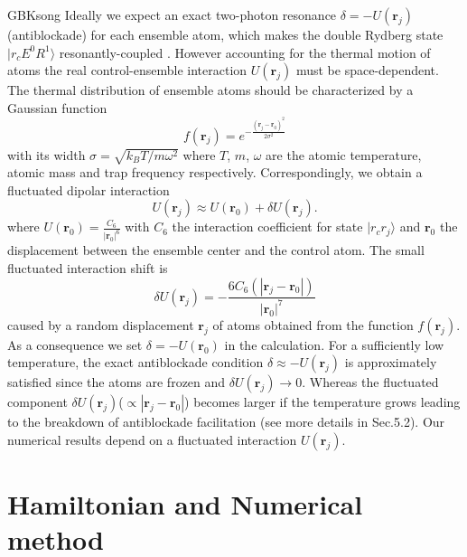 \documentclass{cpbtex}
\begin{document}
\begin{CJK*}{GBK}{song}
Ideally we expect an exact two-photon resonance $\delta=-U(\bm{r}_j)$(antiblockade) for each ensemble atom, which makes the double Rydberg state $|r_cE^0R^1\rangle$ resonantly-coupled \cite{Ding_2019,PhysRevA.82.062328,PhysRevA.101.042328}.
However accounting for the thermal motion of atoms the real control-ensemble interaction $U(\bm{r}_j)$ must be space-dependent. The thermal distribution of ensemble atoms should be characterized by a Gaussian function \cite{PhysRevLett.118.063606}
\begin{equation}
    f(\bm{r}_j) = e^{-\frac{(\bm{r}_j-\bm{r}_0)^2}{2\sigma^2}}
    \label{Gau1}
\end{equation}
with its width $\sigma=\sqrt{k_BT/m\omega^2}$ where $T$, $m$, $\omega$ are the atomic temperature, atomic mass and trap frequency respectively. Correspondingly, we obtain a fluctuated dipolar interaction \cite{PhysRevLett.128.013603}
\begin{equation}
    U(\bm{r}_j) \approx U(\bm{r}_0)+\delta U(\bm{r}_j).
    \label{perU}
\end{equation}
where $U(\bm{r}_0)=\frac{C_6}{|\bm{r}_0|^6}$ with $C_6$ the interaction coefficient for state $|r_cr_j\rangle$ and $\bm{r}_0$ the displacement between the ensemble center and the control atom. 
The small fluctuated interaction shift is
\begin{equation}
    \delta U(\bm{r}_j)=-\frac{6 C_6(|\bm{r}_j-\bm{r}_0|)}{|\bm{r}_0|^7}
    \label{devr}
\end{equation}
caused by a random displacement $\bm{r}_j$ of atoms obtained from the function $f(\bm{r}_j)$. As a consequence we set $\delta=-U(\mathbf{r}_0)$ in the calculation. For a sufficiently low temperature, the exact antiblockade condition $\delta\approx-U(\bm{r}_j)$ is approximately satisfied since the atoms are frozen and $\delta U(\bm{r}_j)\to 0$. Whereas
the fluctuated component $\delta U(\bm{r}_j)$($\propto  |\bm{r}_j-\bm{r}_0|$) becomes larger if the temperature grows leading to the breakdown of antiblockade facilitation (see more details in Sec.5.2).
Our numerical results depend on a fluctuated interaction $U(\bm{r}_j)$.

\section{Hamiltonian and Numerical method\label{Hami}}


\end{CJK*}
\end{document}
